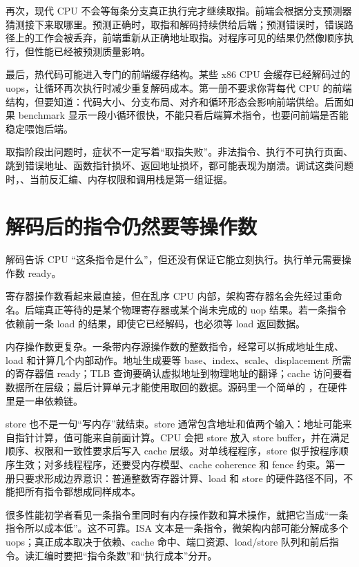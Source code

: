 再次，现代 CPU 不会等每条分支真正执行完才继续取指。前端会根据分支预测器猜测接下来取哪里。预测正确时，取指和解码持续供给后端；预测错误时，错误路径上的工作会被丢弃，前端重新从正确地址取指。对程序可见的结果仍然像顺序执行，但性能已经被预测质量影响。

最后，热代码可能进入专门的前端缓存结构。某些 x86 CPU 会缓存已经解码过的 uops，让循环再次执行时减少重复解码成本。第一册不要求你背每代 CPU 的前端结构，但要知道：代码大小、分支布局、对齐和循环形态会影响前端供给。后面如果 benchmark 显示一段小循环很快，不能只看后端算术指令，也要问前端是否能稳定喂饱后端。

\begin{warningbox}
取指阶段出问题时，症状不一定写着“取指失败”。非法指令、执行不可执行页面、跳到错误地址、函数指针损坏、返回地址损坏，都可能表现为崩溃。调试这类问题时，、当前反汇编、内存权限和调用栈是第一组证据。
\end{warningbox}

\section{解码后的指令仍然要等操作数}

解码告诉 CPU “这条指令是什么”，但还没有保证它能立刻执行。执行单元需要操作数 ready。

寄存器操作数看起来最直接，但在乱序 CPU 内部，架构寄存器名会先经过重命名。后端真正等待的是某个物理寄存器或某个尚未完成的 uop 结果。若一条指令依赖前一条 load 的结果，即使它已经解码，也必须等 load 返回数据。

内存操作数更复杂。一条带内存源操作数的整数指令，经常可以拆成地址生成、load 和计算几个内部动作。地址生成要等 base、index、scale、displacement 所需的寄存器值 ready；TLB 查询要确认虚拟地址到物理地址的翻译；cache 访问要看数据所在层级；最后计算单元才能使用取回的数据。源码里一个简单的 ，在硬件里是一串依赖链。

store 也不是一句“写内存”就结束。store 通常包含地址和值两个输入：地址可能来自指针计算，值可能来自前面计算。CPU 会把 store 放入 store buffer，并在满足顺序、权限和一致性要求后写入 cache 层级。对单线程程序，store 似乎按程序顺序生效；对多线程程序，还要受内存模型、cache coherence 和 fence 约束。第一册只要求形成边界意识：普通整数寄存器计算、load 和 store 的硬件路径不同，不能把所有指令都想成同样成本。

\begin{deepdive}
很多性能初学者看见一条指令里同时有内存操作数和算术操作，就把它当成“一条指令所以成本低”。这不可靠。ISA 文本是一条指令，微架构内部可能分解成多个 uops；真正成本取决于依赖、cache 命中、端口资源、load/store 队列和前后指令。读汇编时要把“指令条数”和“执行成本”分开。
\end{deepdive}

